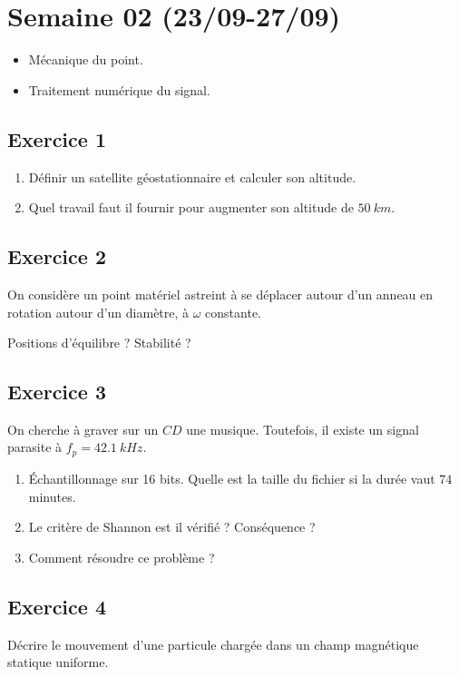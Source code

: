 \section{Semaine 02 (23/09-27/09) }


\begin{itemize}
	\item Mécanique du point.
	\item Traitement numérique du signal.
\end{itemize}

\subsection{Exercice 1}

\begin{enumerate}
	\item Définir un satellite géostationnaire et calculer son altitude.
	\item Quel travail faut il fournir pour augmenter son altitude de $\SI{50}{km}$.
\end{enumerate}

\subsection{Exercice 2}

On considère un point matériel astreint à se déplacer autour d'un anneau en rotation autour d'un diamètre, à $\omega$ constante.

Positions d'équilibre ? Stabilité ?

\subsection{Exercice 3}

On cherche à graver sur un $CD$ une musique. Toutefois, il existe un signal parasite à $f_p = \SI{42.1}{kHz}$. 

\begin{enumerate}
	\item Échantillonnage sur 16 bits. Quelle est la taille du fichier si la durée vaut $74$ minutes.
	\item Le critère de Shannon est il vérifié ? Conséquence ?
	\item Comment résoudre ce problème ?
\end{enumerate}


\subsection{Exercice 4}

Décrire le mouvement d'une particule chargée dans un champ magnétique statique uniforme.
